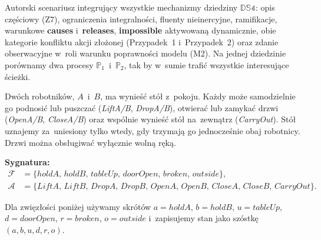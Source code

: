 \documentclass[11pt,a4paper]{article}
\newcommand{\causes}{\textbf{causes}}
\newcommand{\impossible}{\textbf{impossible}}
\newcommand{\releases}{\textbf{releases}}
\theoremstyle{definition}
\begin{document}
\noindent Autorski scenariusz integrujący wszystkie mechanizmy
dziedziny $\mathbb{DS4}$: opis częściowy (Z7), ograniczenia integralności,
fluenty nieinercyjne, ramifikacje, warunkowe \causes{} i~\releases{},
\impossible{} aktywowaną dynamicznie, obie kategorie konfliktu akcji
złożonej (Przypadek~1 i~Przypadek~2) oraz zdanie obserwacyjne w~roli warunku
poprawności modelu (M2). Na jednej dziedzinie porównamy dwa procesy $\mathbb{P}_1$~i~$\mathbb{P}_2$,
tak by w~sumie trafić wszystkie interesujące ścieżki.

Dwóch robotników, $A$~i~$B$, ma wynieść stół z~pokoju. Każdy może
samodzielnie go podnosić lub puszczać (\textit{LiftA/B}, \textit{DropA/B}),
otwierać lub zamykać drzwi (\textit{OpenA/B}, \textit{CloseA/B}) oraz
wspólnie wynieść stół na~zewnątrz (\textit{CarryOut}). Stół uznajemy
za~uniesiony tylko wtedy, gdy trzymają go jednocześnie obaj robotnicy.
Drzwi można obsługiwać wyłącznie wolną ręką.

\medskip
\noindent\textbf{Sygnatura:}
\begin{align*}
  \mathcal{F} &= \{\mathit{holdA},\, \mathit{holdB},\, \mathit{tableUp},\,
                   \mathit{doorOpen},\, \mathit{broken},\, \mathit{outside}\}, \\
  \mathcal{A} &= \{\mathit{LiftA},\, \mathit{LiftB},\, \mathit{DropA},\, \mathit{DropB},\,
                   \mathit{OpenA},\, \mathit{OpenB},\, \mathit{CloseA},\, \mathit{CloseB},\,
                   \mathit{CarryOut}\}.
\end{align*}

\smallskip\noindent
Dla zwięzłości poniżej używamy skrótów
$a = \mathit{holdA}$, $b = \mathit{holdB}$, $u = \mathit{tableUp}$,
$d = \mathit{doorOpen}$, $r = \mathit{broken}$, $o = \mathit{outside}$
i~zapisujemy stan jako szóstkę $(a,b,u,d,r,o)$.
\end{document}
